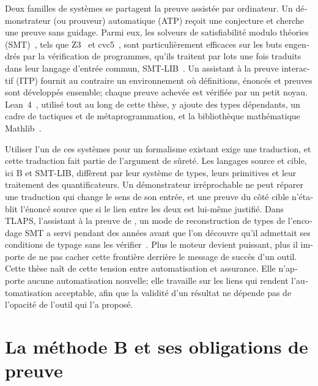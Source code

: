 \begin{otherlanguage}{french}
Deux familles de systèmes se partagent la preuve assistée par ordinateur. Un
démonstrateur (ou prouveur) automatique (ATP) reçoit une conjecture et cherche
une preuve sans guidage. Parmi eux, les solveurs de satisfiabilité modulo
théories (SMT)~\cite{barrett2021smt}, tels que Z3~\cite{demoura2008z3} et
cvc5~\cite{barbosa2022cvc5}, sont particulièrement efficaces sur les
buts engendrés par la vérification de programmes, qu'ils
traitent par lots une fois traduits dans leur langage d'entrée commun,
SMT-LIB~\cite{barrett2010smtlib}. Un assistant à la
preuve interactif (ITP) fournit au contraire un environnement où définitions,
énoncés et preuves sont développés ensemble; chaque preuve achevée est
vérifiée par un petit noyau. Lean~4~\cite{deMouraUllrich2021Lean4}, utilisé
tout au long de cette thèse, y ajoute des types dépendants, un cadre de
tactiques et de métaprogrammation, et la bibliothèque mathématique
Mathlib~\cite{mathlib4}.

Utiliser l'un de ces systèmes pour un formalisme existant exige une
traduction, et cette traduction fait partie de l'argument de sûreté. Les
langages source et cible, ici B et SMT-LIB, diffèrent par leur système de
types, leurs primitives et leur traitement des quantificateurs. Un
démonstrateur irréprochable ne peut réparer une traduction qui change le sens
de son entrée, et une preuve du côté cible n'établit l'énoncé source que si le
lien entre les deux est lui-même justifié. Dans TLAPS, l'assistant à la
preuve de \tlaplus, un mode de reconstruction de types de l'encodage SMT a
servi pendant des années avant que l'on découvre qu'il admettait ses
conditions de typage sans les vérifier~\cite{defourne2025encoding}. Plus le
moteur devient puissant, plus il importe de ne pas cacher cette frontière derrière le message de succès
d'un outil. Cette thèse naît de cette tension entre automatisation et
assurance. Elle n'apporte aucune automatisation nouvelle; elle travaille sur
les liens qui rendent l'automatisation acceptable, afin que la validité d'un
résultat ne dépende pas de l'opacité de l'outil qui l'a proposé.

\section*{La méthode B et ses obligations de preuve}


\end{otherlanguage}
